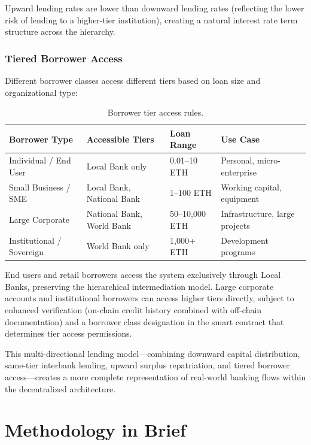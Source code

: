 \documentclass[12pt,a4paper]{report}
\newcommand{\tableheadfont}{\bfseries\small\color{PrimaryBlue}}
\newenvironment{moderntable}[1][H]{%
    \begin{table}[#1]\centering\small%
    \renewcommand{\arraystretch}{1.35}%
}{%
    \end{table}%
}
\begin{document}
Upward lending rates are lower than downward lending rates (reflecting the lower risk of lending to a higher-tier institution), creating a natural interest rate term structure across the hierarchy.

\subsubsection{Tiered Borrower Access}

Different borrower classes access different tiers based on loan size and organizational type:

\begin{moderntable}
\caption{Borrower tier access rules.}
\begin{tabular}{@{} >{\raggedright}p{3cm} >{\raggedright}p{3.5cm} >{\raggedright}p{2.5cm} >{\raggedright\arraybackslash}p{3cm} @{}}
\toprule
\tableheadfont Borrower Type & \tableheadfont Accessible Tiers & \tableheadfont Loan Range & \tableheadfont Use Case \\
\midrule
\rowcolor{RowShade}
Individual / End User & Local Bank only & 0.01--10 ETH & Personal, micro-enterprise \\
Small Business / SME & Local Bank, National Bank & 1--100 ETH & Working capital, equipment \\
\rowcolor{RowShade}
Large Corporate & National Bank, World Bank & 50--10,000 ETH & Infrastructure, large projects \\
Institutional / Sovereign & World Bank only & 1,000+ ETH & Development programs \\
\bottomrule
\end{tabular}
\end{moderntable}

End users and retail borrowers access the system exclusively through Local Banks, preserving the hierarchical intermediation model. Large corporate accounts and institutional borrowers can access higher tiers directly, subject to enhanced verification (on-chain credit history combined with off-chain documentation) and a borrower class designation in the smart contract that determines tier access permissions.

This multi-directional lending model---combining downward capital distribution, same-tier interbank lending, upward surplus repatriation, and tiered borrower access---creates a more complete representation of real-world banking flows within the decentralized architecture.

\section{Methodology in Brief}
\end{document}

